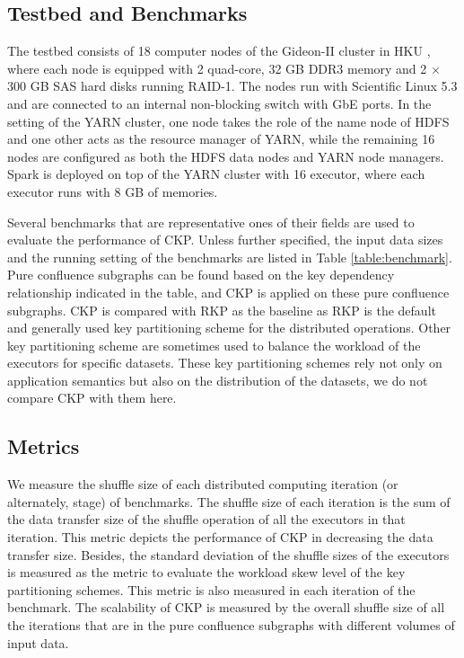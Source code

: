 \documentclass[10pt,journal,compsoc]{IEEEtran}
\begin{document}
\subsection{Testbed and Benchmarks}
The testbed consists of 18 computer nodes of the Gideon-II cluster in HKU \cite{gideon}, where each node is equipped with 2 quad-core, 32 GB DDR3 memory and 2 $\times$ 300 GB SAS hard disks running RAID-1. 
The nodes run with Scientific Linux 5.3 and are connected to an internal non-blocking switch with GbE ports. 
In the setting of the YARN cluster, one node takes the role of  the name node of HDFS and one other acts as the resource manager of YARN, while the remaining 16 nodes are configured as both the HDFS data nodes and YARN node managers. 
Spark is deployed on top of the YARN cluster with 16 executor, where each executor runs with 8 GB of memories. 

Several benchmarks that are representative ones of their fields are used to evaluate the performance of CKP.
Unless further specified, the input data sizes and the running setting of the benchmarks are listed in Table \ref{table:benchmark}.
Pure confluence subgraphs can be found based on the key dependency relationship indicated in the table, and CKP is applied on these pure confluence subgraphs. 
CKP is compared with RKP as the baseline as RKP is the default and generally used key partitioning scheme for the distributed operations. 
Other key partitioning scheme are sometimes used to balance the workload of the executors for specific datasets. 
These key partitioning schemes rely not only on application semantics but also on the distribution of the datasets, we do not compare CKP with them here. 

\subsection{Metrics}
We measure the shuffle size of each distributed computing iteration (or alternately, stage) of benchmarks. 
The shuffle size of each iteration is the sum of the data transfer size of the shuffle operation of all the executors in that iteration. 
This metric depicts the performance of CKP in decreasing the data transfer size. 
Besides, the standard deviation of the shuffle sizes of the executors is measured as the metric to evaluate the workload skew level of the key partitioning schemes. 
This metric is also measured in each iteration of the benchmark. 
The scalability of CKP is measured by the overall shuffle size of all the iterations that are in the pure confluence subgraphs with different volumes of input data. 
\end{document}
